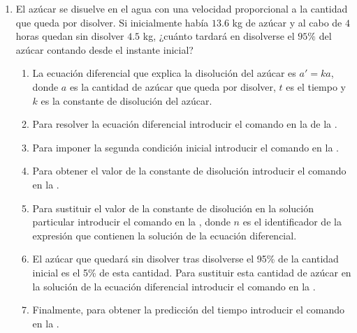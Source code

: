 \begin{enumerate}[leftmargin=*]
\item El azúcar se disuelve en el agua con una velocidad proporcional a la cantidad que queda por disolver.
      Si inicialmente había $13.6$ kg de azúcar y al cabo de $4$ horas quedan sin disolver $4.5$ kg, ¿cuánto tardará en disolverse el $95\%$ del
      azúcar contando desde el instante inicial?
      \begin{indication}
      \begin{enumerate}
      \item La ecuación diferencial que explica la disolución del azúcar es $a'=ka$, donde $a$ es la cantidad de azúcar que queda por disolver, $t$ es el tiempo y $k$ es la constante de disolución del azúcar.
      \item Para resolver la ecuación diferencial introducir el comando  en la  de la .
      \item Para imponer la segunda condición inicial introducir el comando  en la .
      \item Para obtener el valor de la constante de disolución introducir el comando  en la .
      \item Para sustituir el valor de la constante de disolución en la solución particular introducir el comando   en la , donde $n$ es el identificador de la expresión que contienen la solución de la ecuación diferencial.
      \item El azúcar que quedará sin disolver tras disolverse el 95\% de la cantidad inicial es el 5\% de esta cantidad.
            Para sustituir esta cantidad de azúcar en la solución de la ecuación diferencial introducir el comando  en la .
      \item Finalmente, para obtener la predicción del tiempo introducir el comando   en la .
      \end{enumerate}
      \end{indication}

\end{enumerate}


